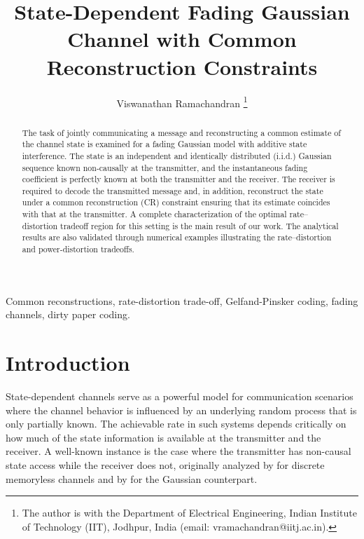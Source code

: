 \documentclass[journal]{IEEEtran}
\begin{document}
\title{State-Dependent Fading Gaussian Channel with Common Reconstruction Constraints}
\author{Viswanathan Ramachandran
\thanks{The author is with the Department of Electrical Engineering, Indian Institute of Technology (IIT), Jodhpur, India (email: vramachandran@iitj.ac.in).}
}
\maketitle

\begin{abstract}
The task of jointly communicating a message and reconstructing a common estimate of the channel state is examined for a fading Gaussian model with additive state interference. The state is an independent and identically distributed (i.i.d.) Gaussian sequence known non-causally at the transmitter, and the instantaneous fading coefficient is perfectly known at both the transmitter and the receiver. The receiver is required to decode the transmitted message and, in addition, reconstruct the state under a common reconstruction (CR) constraint ensuring that its estimate coincides with that at the transmitter. A complete characterization of the optimal rate–distortion tradeoff region for this setting is the main result of our work. The analytical results are also validated through numerical examples illustrating the rate–distortion and power-distortion tradeoffs.
\end{abstract}

\begin{IEEEkeywords}
Common reconstructions, rate-distortion trade-off, Gelfand-Pinsker coding, fading channels, dirty paper coding.
\end{IEEEkeywords}

\IEEEpeerreviewmaketitle

\section{Introduction}
State-dependent channels serve as a powerful model for communication scenarios where the channel behavior is influenced by an underlying random process that is only partially known. The achievable rate in such systems depends critically on how much of the state information is available at the transmitter and the receiver. A well-known instance is the case where the transmitter has non-causal state access while the receiver does not, originally analyzed by \cite{gel1980coding} for discrete memoryless channels and by \cite{costa1983writing} for the Gaussian counterpart.
\end{document}
